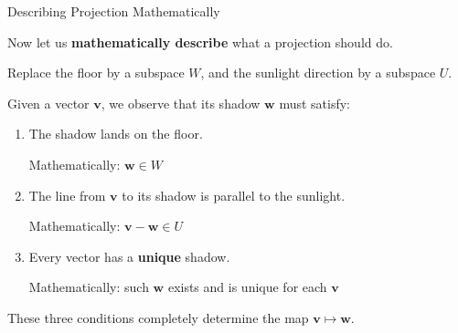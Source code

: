 \documentclass[10pt]{beamer}
\theoremstyle{definition}
\newtheorem{defi}{Definition}[section]
\newcommand{\x}[1]{\alert{\textbf{#1}}}
\begin{document}
\begin{frame}{Describing Projection Mathematically}

Now let us \x{mathematically describe} what a projection should do.

\vspace{0.5em}

Replace the floor by a subspace $W$, and the sunlight direction by a subspace $U$.

\vspace{0.5em}

Given a vector $\mathbf{v}$, we observe that its shadow $\mathbf{w}$ must satisfy:

\vspace{0.3em}

\begin{enumerate}
\item The shadow lands on the floor.

Mathematically: $\mathbf{w} \in W$

\vspace{0.3em}

\item The line from $\mathbf{v}$ to its shadow is parallel to the sunlight.

Mathematically: $\mathbf{v} - \mathbf{w} \in U$

\vspace{0.3em}

\item Every vector has a \x{unique} shadow.

Mathematically: such $\mathbf{w}$ exists and is unique for each $\mathbf{v}$
\end{enumerate}

\vspace{0.5em}

These three conditions completely determine the map $\mathbf{v} \mapsto \mathbf{w}$.

\end{frame}
\end{document}

